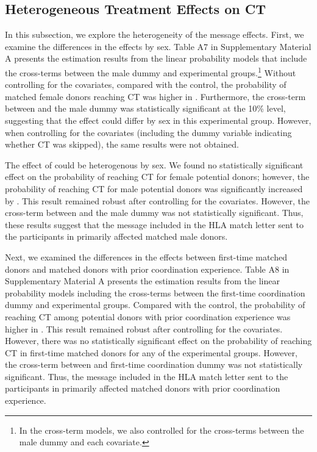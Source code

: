 \documentclass[12pt, a4paper]{article}
\newcommand{\revise}[1]{{\color{red}{#1}}}
\begin{document}
\hypertarget{heterogeneous-treatment-effects-on-ct}{%
\subsection{Heterogeneous Treatment Effects on CT}\label{heterogeneous-treatment-effects-on-ct}}

In this subsection, we explore the heterogeneity of the message effects. First, we examine the differences in the effects by sex. Table A7 in Supplementary Material A presents the estimation results from the linear probability models that include the cross-terms between the male dummy and experimental groups.\footnote{In the cross-term models, we also controlled for the cross-terms between the male dummy and each covariate.} Without controlling for the covariates, compared with the control, the probability of matched female donors reaching CT was higher in \revise{the BothMessage group}. Furthermore, the cross-term between \revise{the BothMessage group} and the male dummy was statistically significant at the 10\% level, suggesting that the effect could differ by sex in this experimental group. However, when controlling for the covariates (including the dummy variable indicating whether CT was skipped), the same results were not obtained.

The effect of \revise{the MatchMessage group} could be heterogenous by sex. We found no statistically significant effect on the probability of reaching CT for female potential donors; however, the probability of reaching CT for male potential donors was significantly increased by \revise{the MatchMessage group}. This result remained robust after controlling for the covariates. However, the cross-term between \revise{the MatchMessage group} and the male dummy was not statistically significant. Thus, these results suggest that the \revise{matching difficulty} message included in the HLA match letter sent to the participants in \revise{the MatchMessage group} primarily affected matched male donors.

Next, we examined the differences in the effects between first-time matched donors and matched donors with prior coordination experience. Table A8 in Supplementary Material A presents the estimation results from the linear probability models including the cross-terms between the first-time coordination dummy and experimental groups. Compared with the control, the probability of reaching CT among potential donors with prior coordination experience was higher in \revise{the MatchMessage group}. This result remained robust after controlling for the covariates. However, there was no statistically significant effect on the probability of reaching CT in first-time matched donors for any of the experimental groups. However, the cross-term between \revise{the MatchMessage group} and first-time coordination dummy was not statistically significant. Thus, the \revise{matching difficulty} message included in the HLA match letter sent to the participants in \revise{the MatchMessage group} primarily affected matched donors with prior coordination experience.
\end{document}
